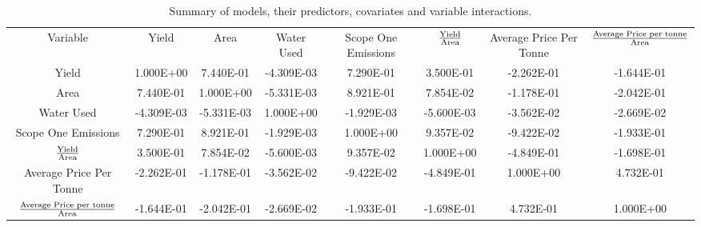 \documentclass[12pt,australian]{article}
\begin{document}
\begin{sloppypar}
\begin{table}[]
  \caption{Summary of models, their predictors, covariates and variable interactions.}
  \label{tab:tab2}
  \begin{tabular}{cccccccc}
  Variable                             & Yield      & Area       & Water Used & Scope One Emissions & $\text{Yield}\over\text{Area}$ & Average Price Per Tonne & ${\text{Average Price per tonne}\over\text{Area}}$ \\
  Yield                                & 1.000E+00  & 7.440E-01  & -4.309E-03 & 7.290E-01           & 3.500E-01            & -2.262E-01              & -1.644E-01                           \\
  Area                                 & 7.440E-01  & 1.000E+00  & -5.331E-03 & 8.921E-01           & 7.854E-02            & -1.178E-01              & -2.042E-01                           \\
  Water Used                           & -4.309E-03 & -5.331E-03 & 1.000E+00  & -1.929E-03          & -5.600E-03           & -3.562E-02              & -2.669E-02                           \\
  Scope One Emissions                  & 7.290E-01  & 8.921E-01  & -1.929E-03 & 1.000E+00           & 9.357E-02            & -9.422E-02              & -1.933E-01                           \\
  $\text{Yield}\over\text{Area}$                 & 3.500E-01  & 7.854E-02  & -5.600E-03 & 9.357E-02           & 1.000E+00            & -4.849E-01              & -1.698E-01                           \\
  Average Price Per Tonne              & -2.262E-01 & -1.178E-01 & -3.562E-02 & -9.422E-02          & -4.849E-01           & 1.000E+00               & 4.732E-01                            \\
  ${\text{Average Price per tonne}\over\text{Area}}$ & -1.644E-01 & -2.042E-01 & -2.669E-02 & -1.933E-01          & -1.698E-01           & 4.732E-01               & 1.000E+00                           
  \end{tabular}
  \end{table}


\end{sloppypar}
\end{document}
